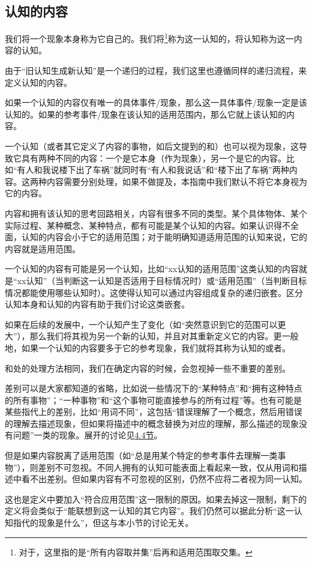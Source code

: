 \subsection{认知的内容}
我们将一个现象本身称为它自己的。我们将\footnote{对于\rigorous，这里指的是“所有内容取并集”后再和适用范围取交集。}称为这一认知的，将认知称为这一内容的认知。
\begin{explain}
由于“旧认知生成新认知”是一个递归的过程，我们这里也遵循同样的递归流程，来定义认知的内容。

如果一个认知的内容仅有唯一的具体事件/现象，那么这一具体事件/现象一定是该认知的。如果的参考事件/现象在该认知的适用范围内，那么它就上该认知的内容。

一个认知（或者其它定义了内容的事物，如后文提到的和）也可以视为现象，这导致它具有两种不同的内容：一个是它本身（作为现象），另一个是它的内容。比如“有人和我说楼下出了车祸”就同时有“有人和我说话”和“楼下出了车祸”两种内容。这两种内容需要分别处理，如果不做提及，本指南中我们默认不将它本身视为它的内容。

内容和拥有该认知的思考回路相关，内容有很多不同的类型。某个具体物体、某个实际过程、某种概念、某种特点，都有可能是某个认知的内容。如果认识得不全面，认知的内容会小于它的适用范围；对于能明确知道适用范围的认知来说，它的内容就是适用范围。

一个认知的内容有可能是另一个认知，比如“xx认知的适用范围”这类认知的内容就是“xx认知”（当判断这一认知是否适用于目标情况时）或“适用范围”（当判断目标情况都能使用哪些认知时）。这使得认知可以通过内容组成复杂的递归嵌套。区分认知本身和认知的内容有助于我们讨论这类嵌套。

如果在后续的发展中，一个认知产生了变化（如“突然意识到它的范围可以更大”），那么我们将其视为另一个新的认知，并且对其重新定义它的内容。更一般地，如果一个认知的内容要多于它的参考现象，我们就将其称为认知的或者。
\end{explain}
和处的处理方法相同，我们在确定内容的时候，会忽视掉一些不重要的差别。
\begin{explain}
差别可以是大家都知道的省略，比如说一些情况下的“某种特点”和“拥有这种特点的所有事物”；“一种事物”和“这个事物可能直接参与的所有过程”等。也有可能是某些指代上的差别，比如“用词不同”，这包括“错误理解了一个概念，然后用错误的理解去描述现象，但如果将描述中的概念替换为对应的理解，那么描述的现象没有问题”一类的现象。展开的讨论见\hyperref[sec:解读]{4.4节}。

但是如果内容脱离了适用范围（如“总是用某个特定的参考事件去理解一类事物”），则差别不可忽视。不同人拥有的认知可能表面上看起来一致，仅从用词和描述中看不出差别。但如果内容有不可忽视的区别，仍然不应将二者视为同一认知。

这也是定义中要加入“符合应用范围”这一限制的原因。如果去掉这一限制，剩下的定义将会类似于“能联想到这一认知的其它内容”。我们仍然可以据此分析“这一认知指代的现象是什么”，但这与本小节的讨论无关。
\end{explain}
